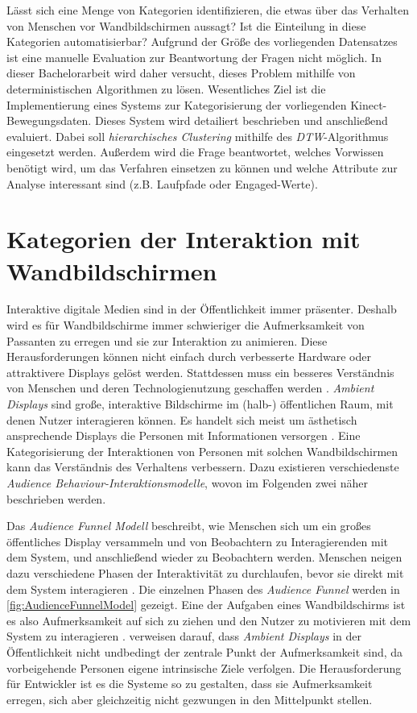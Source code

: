 Lässt sich eine Menge von Kategorien identifizieren, die etwas über das Verhalten von Menschen vor Wandbildschirmen aussagt?
Ist die Einteilung in diese Kategorien automatisierbar?
Aufgrund der Größe des vorliegenden Datensatzes ist eine manuelle Evaluation zur Beantwortung der Fragen nicht möglich.
In dieser Bachelorarbeit wird daher versucht, dieses Problem mithilfe von deterministischen Algorithmen zu lösen.
Wesentliches Ziel ist die Implementierung eines Systems zur Kategorisierung der vorliegenden Kinect-Bewegungsdaten.
Dieses System wird detailiert beschrieben und anschließend evaluiert.
Dabei soll \emph{hierarchisches Clustering} mithilfe des \emph{\ac{DTW}}-Algorithmus eingesetzt werden.
Außerdem wird die Frage beantwortet, welches Vorwissen benötigt wird,
um das Verfahren einsetzen zu können und welche Attribute zur Analyse interessant sind (z.B. Laufpfade oder Engaged-Werte).


\section{Kategorien der Interaktion mit Wandbildschirmen}
\label{chapter1-KategorienInteraktion-Wandbildschirme}
Interaktive digitale Medien sind in der Öffentlichkeit immer präsenter.
Deshalb wird es für Wandbildschirme immer schwieriger die Aufmerksamkeit von Passanten zu erregen
und sie zur Interaktion zu animieren.
Diese Herausforderungen können nicht einfach durch verbesserte Hardware oder attraktivere Displays gelöst werden.
Stattdessen muss ein besseres Verständnis von Menschen und deren Technologienutzung geschaffen werden \citep{wouters_uncovering_2016}.
\emph{Ambient Displays} sind große, interaktive Bildschirme im (halb-) öffentlichen Raum, mit denen Nutzer interagieren können.
Es handelt sich meist um ästhetisch ansprechende Displays die Personen mit Informationen versorgen \citep{mankoff_heuristic_2003}.
Eine Kategorisierung der Interaktionen von Personen mit solchen Wandbildschirmen kann das Verständnis des Verhaltens verbessern.
Dazu existieren verschiedenste \emph{Audience Behaviour-Interaktionsmodelle}, wovon im Folgenden zwei näher beschrieben werden.

Das \emph{Audience Funnel Modell} beschreibt, wie Menschen sich um ein großes öffentliches Display versammeln
und von Beobachtern zu Interagierenden mit dem System, und anschließend wieder zu Beobachtern werden.
Menschen neigen dazu verschiedene Phasen der Interaktivität zu durchlaufen,
bevor sie direkt mit dem System interagieren \citep{wouters_uncovering_2016, mai_audience_2018}.
Die einzelnen Phasen des \emph{Audience Funnel} werden in \autoref{fig:AudienceFunnelModel} gezeigt.
Eine der Aufgaben eines Wandbildschirms ist es also Aufmerksamkeit auf sich zu ziehen
und den Nutzer zu motivieren mit dem System zu interagieren \citep{mai_audience_2018}.
\citet{mai_audience_2018} verweisen darauf, dass \emph{Ambient Displays} in der Öffentlichkeit
nicht undbedingt der zentrale Punkt der Aufmerksamkeit sind, da vorbeigehende Personen eigene intrinsische Ziele verfolgen.
Die Herausforderung für Entwickler ist es die Systeme so zu gestalten,
dass sie Aufmerksamkeit erregen, sich aber gleichzeitig nicht gezwungen in den Mittelpunkt stellen.

